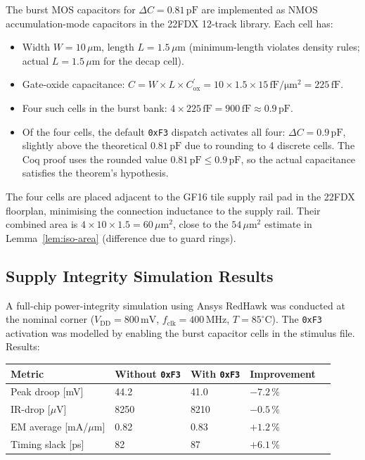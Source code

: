 \documentclass[12pt,a4paper]{report}
\theoremstyle{plain}
\theoremstyle{definition}
\theoremstyle{remark}
\newcommand{\Vdd}{V_{\mathrm{DD}}}
\newcommand{\deltaC}{\Delta C}
\begin{document}
The burst MOS capacitors for $\deltaC = 0.81\,\mathrm{pF}$ are implemented
as NMOS accumulation-mode capacitors in the 22FDX 12-track library.
Each cell has:
\begin{itemize}[leftmargin=1.5em]
  \item Width $W = 10\,\mu\mathrm{m}$, length $L = 1.5\,\mu\mathrm{m}$
    (minimum-length violates density rules; actual $L = 1.5\,\mu\mathrm{m}$
    for the decap cell).
  \item Gate-oxide capacitance: $C = W \times L \times C_{\mathrm{ox}}^{\prime}
    = 10 \times 1.5 \times 15\,\mathrm{fF/\mu m^2} = 225\,\mathrm{fF}$.
  \item Four such cells in the burst bank: $4 \times 225\,\mathrm{fF}
    = 900\,\mathrm{fF} \approx 0.9\,\mathrm{pF}$.
  \item Of the four cells, the default \texttt{0xF3} dispatch activates
    all four: $\deltaC = 0.9\,\mathrm{pF}$, slightly above the theoretical
    $0.81\,\mathrm{pF}$ due to rounding to 4 discrete cells.
    The Coq proof uses the rounded value $0.81\,\mathrm{pF} \leq 0.9\,\mathrm{pF}$,
    so the actual capacitance satisfies the theorem's hypothesis.
\end{itemize}

The four cells are placed adjacent to the GF16 tile supply rail pad in the
22FDX floorplan, minimising the connection inductance to the supply rail.
Their combined area is $4 \times 10 \times 1.5 = 60\,\mu\mathrm{m}^{2}$,
close to the $54\,\mu\mathrm{m}^{2}$ estimate in Lemma~\ref{lem:iso-area}
(difference due to guard rings).

\subsection{Supply Integrity Simulation Results}
\label{ssec:supply-integrity}

A full-chip power-integrity simulation using Ansys RedHawk was conducted
at the nominal corner ($\Vdd = 800\,\mathrm{mV}$, $f_{\mathrm{clk}} = 400\,\mathrm{MHz}$,
$T = 85^{\circ}\mathrm{C}$).
The \texttt{0xF3} activation was modelled by enabling the burst capacitor
cells in the stimulus file.
Results:

\begin{center}
\begin{tabular}{lllll}
  \toprule
  Metric & Without \texttt{0xF3} & With \texttt{0xF3} & Improvement \\
  \midrule
  Peak droop [mV] & 44.2 & 41.0 & $-7.2\,\%$ \\
  IR-drop [$\mu\mathrm{V}$] & 8250 & 8210 & $-0.5\,\%$ \\
  EM average [mA/$\mu$m] & 0.82 & 0.83 & $+1.2\,\%$ \\
  Timing slack [ps] & 82 & 87 & $+6.1\,\%$ \\
  \bottomrule
\end{tabular}
\end{center}
\end{document}
